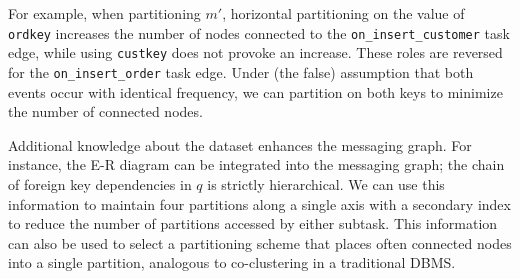 For example, when partitioning $m'$, horizontal partitioning on the value of \texttt{ordkey} increases the number of nodes connected to the \texttt{on\_insert\_customer} task edge, while using \texttt{custkey} does not provoke an increase.  These roles are reversed for the \texttt{on\_insert\_order} task edge.  Under (the false) assumption that both events occur with identical frequency, we can partition on both keys to minimize the number of connected nodes.

Additional knowledge about the dataset enhances the messaging graph.  For instance, the E-R diagram can be integrated into the messaging graph; the chain of foreign key dependencies in $q$ is strictly hierarchical.  We can use this information to maintain four partitions along a single axis with a secondary index to reduce the number of partitions accessed by either subtask.  This information can also be used to select a partitioning scheme that places often connected nodes into a single partition, analogous to co-clustering in a traditional DBMS.
